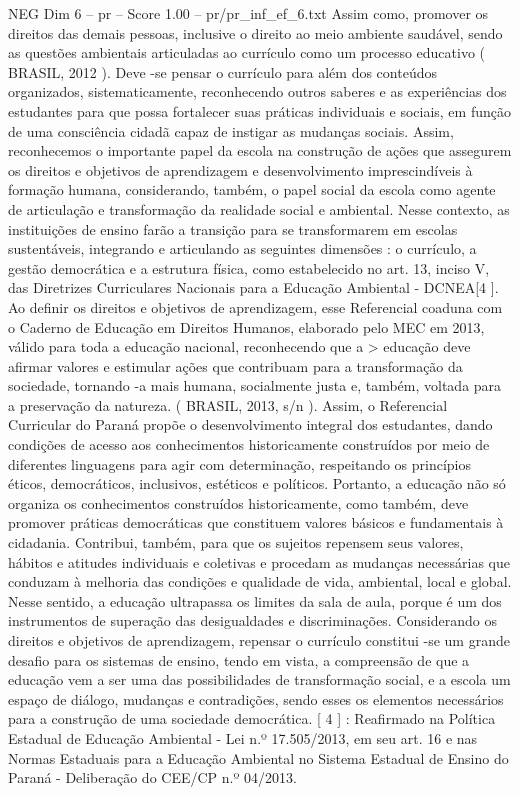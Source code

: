 \begin{textsample}{NEG Dim 6 – pr – Score 1.00 – pr/pr\_inf\_ef\_6.txt}
Assim como, promover os direitos das demais pessoas, inclusive o direito ao meio ambiente saudável, sendo as questões ambientais articuladas ao currículo como um processo educativo ( BRASIL, 2012 ).
Deve -se pensar o currículo para além dos conteúdos organizados, sistematicamente, reconhecendo outros saberes e as experiências dos estudantes para que possa fortalecer suas práticas individuais e sociais, em função de uma consciência cidadã capaz de instigar as mudanças sociais.
Assim, reconhecemos o importante papel da escola na construção de ações que assegurem os direitos e objetivos de aprendizagem e desenvolvimento imprescindíveis à formação humana, considerando, também, o papel social da escola como agente de articulação e transformação da realidade social e ambiental.
Nesse contexto, as instituições de ensino farão a transição para se transformarem em escolas sustentáveis, integrando e articulando as seguintes dimensões : o currículo, a gestão democrática e a estrutura física, como estabelecido no art. 13, inciso V, das Diretrizes Curriculares Nacionais para a Educação Ambiental - DCNEA[4 ].
Ao definir os direitos e objetivos de aprendizagem, esse Referencial coaduna com o Caderno de Educação em Direitos Humanos, elaborado pelo MEC em 2013, válido para toda a educação nacional, reconhecendo que a > educação deve afirmar valores e estimular ações que contribuam para a transformação da sociedade, tornando -a mais humana, socialmente justa e, também, voltada para a preservação da natureza. ( BRASIL, 2013, s/n ).
Assim, o Referencial Curricular do Paraná propõe o desenvolvimento integral dos estudantes, dando condições de acesso aos conhecimentos historicamente construídos por meio de diferentes linguagens para agir com determinação, respeitando os princípios éticos, democráticos, inclusivos, estéticos e políticos.
Portanto, a educação não só organiza os conhecimentos construídos historicamente, como também, deve promover práticas democráticas que constituem valores básicos e fundamentais à cidadania.
Contribui, também, para que os sujeitos repensem seus valores, hábitos e atitudes individuais e coletivas e procedam as mudanças necessárias que conduzam à melhoria das condições e qualidade de vida, ambiental, local e global.
Nesse sentido, a educação ultrapassa os limites da sala de aula, porque é um dos instrumentos de superação das desigualdades e discriminações.
Considerando os direitos e objetivos de aprendizagem, repensar o currículo constitui -se um grande desafio para os sistemas de ensino, tendo em vista, a compreensão de que a educação vem a ser uma das possibilidades de transformação social, e a escola um espaço de diálogo, mudanças e contradições, sendo esses os elementos necessários para a construção de uma sociedade democrática. [ 4 ] : Reafirmado na Política Estadual de Educação Ambiental - Lei n.º 17.505/2013, em seu art. 16 e nas Normas Estaduais para a Educação Ambiental no Sistema Estadual de Ensino do Paraná - Deliberação do CEE/CP n.º 04/2013.

\end{textsample}

